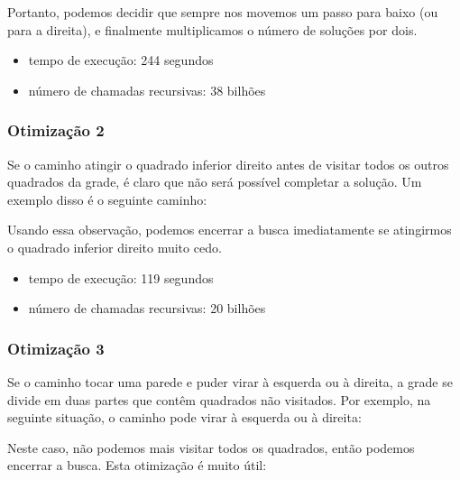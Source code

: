 Portanto, podemos decidir que sempre
nos movemos um passo para baixo (ou para a direita),
e finalmente multiplicamos o número de soluções por dois.

\begin{itemize}
\item
tempo de execução: 244 segundos
\item
número de chamadas recursivas: 38 bilhões
\end{itemize}

\subsubsection{Otimização 2}

Se o caminho atingir o quadrado inferior direito
antes de visitar todos os outros quadrados da grade,
é claro que
não será possível completar a solução.
Um exemplo disso é o seguinte caminho:

\begin{center}
\end{center}
Usando essa observação, podemos encerrar a busca
imediatamente se atingirmos o quadrado inferior direito muito cedo.
\begin{itemize}
\item
tempo de execução: 119 segundos
\item
número de chamadas recursivas: 20 bilhões
\end{itemize}

\subsubsection{Otimização 3}

Se o caminho tocar uma parede
e puder virar à esquerda ou à direita,
a grade se divide em duas partes
que contêm quadrados não visitados.
Por exemplo, na seguinte situação,
o caminho pode virar à esquerda ou à direita:

\begin{center}
\end{center}
Neste caso, não podemos mais visitar todos os quadrados,
então podemos encerrar a busca.
Esta otimização é muito útil:

